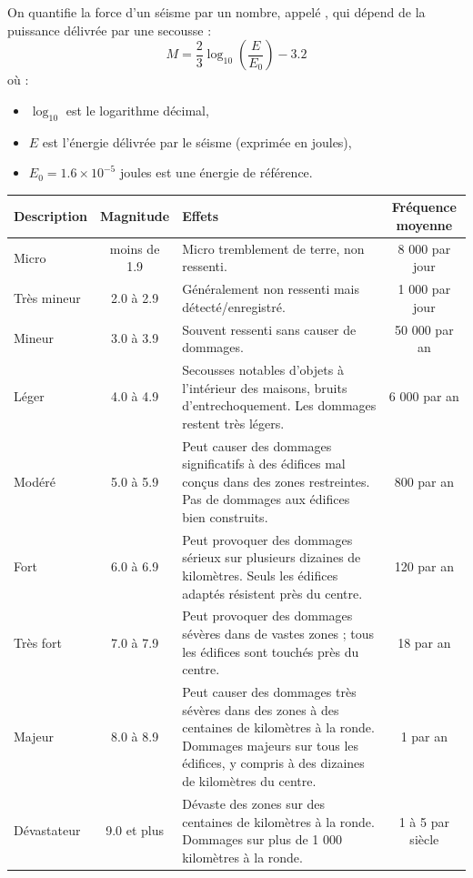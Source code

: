 \documentclass[11pt,class=report,crop=false]{standalone}
\begin{document}
\begin{activite}
   

On quantifie la force d'un séisme par un nombre, appelé , qui dépend de la puissance délivrée par une secousse :
$$M = \frac{2}{3} \log_{10} \left(\frac{E}{E_0} \right) - 3.2$$
où :
\begin{itemize}
  \item $\log_{10}$ est le logarithme décimal,
  \item $E$ est l'énergie délivrée par le séisme (exprimée en joules),
  \item $E_0 = 1.6 \times 10^{-5}$ joules est une énergie de référence.
\end{itemize}  
  
 {\small
\begin{center}
\begin{tabular}{|l|c|p{8cm}|c|}
\hline
Description &	Magnitude &	Effets &Fréquence moyenne \\ \hline\hline
Micro &	moins de 1.9 &	Micro tremblement de terre, non ressenti. &	8 000 par jour\\ \hline
Très mineur &	2.0 à 2.9 &	Généralement non ressenti mais détecté/enregistré. &	1 000 par jour\\ \hline
Mineur& 	3.0 à 3.9& 	Souvent ressenti sans causer de dommages. &	50 000 par an\\ \hline
Léger &	4.0 à 4.9 &	Secousses notables d'objets à l'intérieur des maisons, bruits d'entrechoquement. Les dommages restent très légers. &	6 000 par an\\ \hline
Modéré &	5.0 à 5.9 &	Peut causer des dommages significatifs à des édifices mal conçus dans des zones restreintes. Pas de dommages aux édifices bien construits. &	800 par an\\ \hline
Fort &	6.0 à 6.9 &	Peut provoquer des dommages sérieux sur plusieurs dizaines de kilomètres. Seuls les édifices adaptés résistent près du centre. &	120 par an\\ \hline
Très fort &	7.0 à 7.9 &	Peut provoquer des dommages sévères dans de vastes zones ; tous les édifices sont touchés près du centre. &	18 par an\\ \hline
Majeur &	8.0 à 8.9 &	Peut causer des dommages très sévères dans des zones à des centaines de kilomètres à la ronde. Dommages majeurs sur tous les édifices, y compris à des dizaines de kilomètres du centre. &	1 par an\\ \hline
Dévastateur & 9.0 et plus &	Dévaste des zones sur des centaines de kilomètres à la ronde. Dommages sur plus de 1 000 kilomètres à la ronde. &	1 à 5 par siècle \\ \hline
\end{tabular}


\end{center}}
\end{activite}
\end{document}
